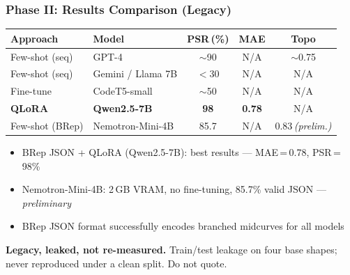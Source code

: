 \begin{frame}[fragile]\frametitle{Phase II: Results Comparison (Legacy)}

\begin{center}
\small
\begin{tabular}{@{}llccc@{}}
\toprule
\textbf{Approach} & \textbf{Model} & \textbf{PSR\,(\%)} & \textbf{MAE} & \textbf{Topo} \\
\midrule
Few-shot (seq)   & GPT-4              & $\sim$90 & N/A  & $\sim$0.75 \\
Few-shot (seq)   & Gemini / Llama 7B  & $<$30    & N/A  & N/A        \\
Fine-tune        & CodeT5-small       & $\sim$50 & N/A  & N/A        \\
\textbf{QLoRA}   & \textbf{Qwen2.5-7B}& \textbf{98} & \textbf{0.78} & N/A \\
Few-shot (BRep)  & Nemotron-Mini-4B   & 85.7     & N/A  & 0.83\,\textit{(prelim.)} \\
\bottomrule
\end{tabular}
\end{center}

\begin{itemize}
\item[\tiny$\blacktriangleright$] BRep JSON + QLoRA (Qwen2.5-7B): best results — MAE\,=\,0.78, PSR\,=\,98\%
\item[\tiny$\blacktriangleright$] Nemotron-Mini-4B: 2\,GB VRAM, no fine-tuning, 85.7\% valid JSON — \textit{preliminary}
\item[\tiny$\blacktriangleright$] BRep JSON format successfully encodes branched midcurves for all models
\end{itemize}

\vspace{2pt}
{\footnotesize \textbf{Legacy, leaked, not re-measured.} Train/test leakage on four base shapes; never reproduced under a clean split. Do not quote.}
\end{frame}

